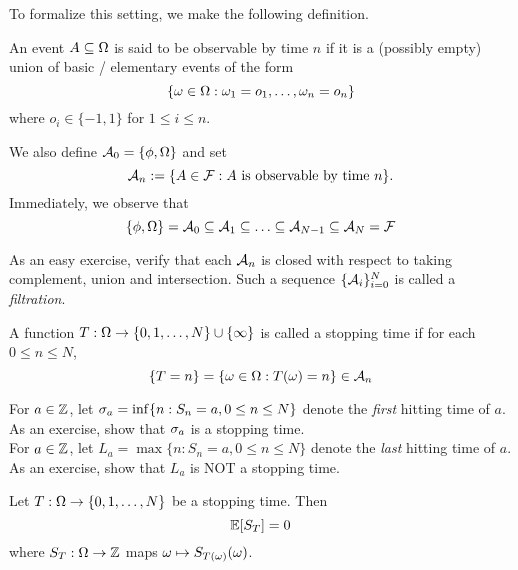 \documentclass[main]{subfiles}
\begin{document}
To formalize this setting, we make the following definition.\\

\begin{definition}
    An event $ A\subseteq\Omega $ is said to be observable by time $ n $ if it is a (possibly empty) union of basic / elementary events of the form \[\{\omega\in\Omega:\omega_1=o_1,\ldots,\omega_n=o_n\}\] where $ o_i\in\{-1,1\} $ for $ 1\le i\le n $.
\end{definition}

We also define $ \mathcal A_0=\{\phi, \Omega\} $ and set \[\mathcal A_n:=\{A\in\mathcal F:A \text{ is observable by time }n\}.\]
Immediately, we observe that \[\{\phi, \Omega\}=\mathcal A_0\subseteq\mathcal A_1\subseteq\ldots\subseteq\mathcal A_{N-1}\subseteq\mathcal A_N=\mathcal F \]

As an easy exercise, verify that each $ \mathcal A_n $ is closed with respect to taking complement, union and intersection. Such a sequence $ \{\mathcal A_i\}_{i=0}^N $ is called a \textit{filtration}.

\begin{definition}
    A function $ T:\Omega\to\{0, 1, \ldots, N\}\cup\{\infty\} $ is called a stopping time if for each $ 0\le n\le N $,  \[\{T=n\}=\{\omega\in\Omega:T(\omega)=n\}\in\mathcal A_n\]
\end{definition}

\ex For $ a\in\mathbb Z $, let $ \sigma_a=\inf\{n: S_n=a, 0\le n\le N\} $ denote the \textit{first} hitting time of $ a $. As an exercise, show that $ \sigma_a $ is a stopping time.\\

\ex For $ a\in\mathbb Z $, let $ L_a=\max\{n: S_n=a, 0\le n\le N\}$ denote the \textit{last} hitting time of $ a $. As an exercise, show that $ L_a $ is NOT a stopping time.

\begin{theorem}
    Let $ T:\Omega\to\{0,1,\ldots,N\} $ be a stopping time. Then \[\mathbb E[S_T]=0\] where $ S_T:\Omega\to\mathbb Z $ maps $ \omega\mapsto S_{T(\omega)}(\omega) $.
\end{theorem}
\end{document}
